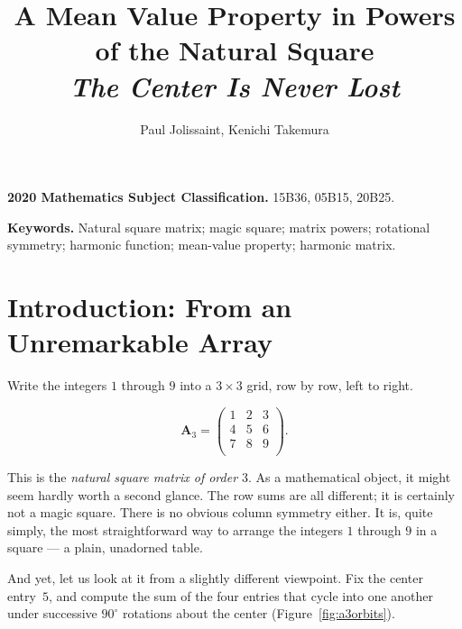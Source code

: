 \documentclass[a4paper,11pt]{article}
\theoremstyle{plain}
\theoremstyle{definition}
\theoremstyle{remark}
\newcommand{\A}{\mathbf{A}}
\begin{document}

\title{\large\bfseries A Mean Value Property in Powers of the Natural Square\\[2pt]
\normalsize \textit{The Center Is Never Lost}}
\author{Paul Jolissaint, Kenichi Takemura}
\date{}
\maketitle
\thispagestyle{empty}

\medskip
\noindent\textbf{2020 Mathematics Subject Classification.}
15B36, 05B15, 20B25.

\medskip
\noindent\textbf{Keywords.}
Natural square matrix; magic square; matrix powers; rotational symmetry;
harmonic function; mean-value property; harmonic matrix.

\bigskip

\section{Introduction: From an Unremarkable Array}


Write the integers $1$ through $9$ into a $3\times 3$ grid, row by row,
left to right. 

\[
  \A_3 =
  \begin{pmatrix}
    1&2&3\\
	4&5&6\\
	7&8&9\\

  \end{pmatrix}.
\]

This is the \emph{natural square matrix of order $3$}.
As a mathematical object, it might seem hardly worth a second glance.
The row sums are all different; it is certainly not a magic square.
There is no obvious column symmetry either.
It is, quite simply, the most straightforward way to arrange the
integers $1$ through $9$ in a square --- a plain, unadorned table.

And yet, let us look at it from a slightly different viewpoint.
Fix the center entry~$5$, and compute the sum of the four entries that
cycle into one another under successive $90^\circ$ rotations about the center
(Figure~\ref{fig:a3orbits}).
\end{document}
